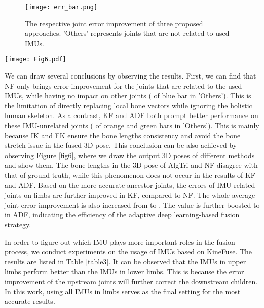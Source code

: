 \documentclass[lettersize,journal]{IEEEtran}
\begin{document}
\begin{figure}[!tp]
 \begin{center}
 	\centerline{\texttt{[image: err\_bar.png]}}
\caption{The respective joint error improvement of three proposed approaches. 'Others' represents joints that are not related to used IMUs.}
\label{fig5}
\end{center}
\end{figure}

\begin{figure*}[!tp]
 \begin{center}
 	\centerline{\texttt{[image: Fig6.pdf]}}
\caption{Illustration of different 3D pose results on Total Capture dataset. Self-occlusions exist in most of used image views on the selected cases, while being solved via kinematic constrains and efficient IMU-vision fusion.}
\label{fig6}
\end{center}
\end{figure*}

We can draw several conclusions by observing the results. First, we can find that NF only brings error improvement for the joints that are related to the used IMUs, while having no impact on other joints ( of blue bar in 'Others'). This is the limitation of directly replacing local bone vectors while ignoring the holistic human skeleton. As a contrast, KF and ADF both prompt better performance on these IMU-unrelated joints ( of orange and green bars in 'Others'). This is mainly because IK and FK ensure the bone lengths consistency and avoid the bone stretch issue in the fused 3D pose. This conclusion can be also achieved by observing Figure \ref{fig6}, where we draw the output 3D poses of different methods and show them. The bone lengths in the 3D pose of AlgTri and NF disagree with that of ground truth, while this phenomenon does not occur in the results of KF and ADF. Based on the more accurate ancestor joints, the errors of IMU-related joints on limbs are further improved in KF, compared to NF. The whole average joint error improvement is also increased from  to . The value is further boosted to  in ADF, indicating the efficiency of the adaptive deep learning-based fusion strategy.

In order to figure out which IMU plays more important roles in the fusion process, we conduct experiments on the usage of IMUs based on KineFuse. The results are listed in Table \ref{table3}. It can be observed that the IMUs in upper limbs perform better than the IMUs in lower limbs. This is because the error improvement of the upstream joints will further correct the downstream children. In this work, using all IMUs in limbs serves as the final setting for the most accurate results.
\end{document}
